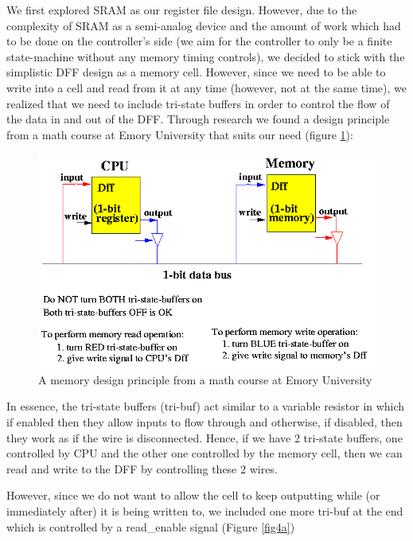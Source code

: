 \documentclass[letterpaper, 11pt]{article}
\begin{document}
	We first explored SRAM as our register file design. However, due to the complexity of SRAM as a semi-analog device and the amount of work which had to be done on the controller's side (we aim for the controller to only be a finite state-machine without any memory timing controls), we decided to stick with the simplistic DFF design as a memory cell. However, since we need to be able to write into a cell and read from it at any time (however, not at the same time), we realized that we need to include tri-state buffers in order to control the flow of the data in and out of the DFF. Through research we found a design principle from a math course at Emory University \cite{4} that suits our need (figure \ref{fig3}): 
	\newpage
	\begin{figure}[htb!]
		\centering
		\includegraphics[width=0.5\linewidth]{report_pics/tristate_emory.png}
		\caption{A memory design principle from a math course at Emory University \cite{4}}
		\label{fig3}
	\end{figure}
	
	In essence, the tri-state buffers (tri-buf) act similar to a variable resistor in which if enabled then they allow inputs to flow through and otherwise, if disabled, then they work as if the wire is disconnected. Hence, if we have 2 tri-state buffers, one controlled by CPU and the other one controlled by the memory cell, then we can read and write to the DFF by controlling these 2 wires.
	
	However, since we do not want to allow the cell to keep outputting while (or immediately after) it is being written to, we included one more tri-buf at the end which is controlled by a read\_enable signal (Figure \ref{fig4a})
	
\end{document}

